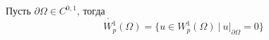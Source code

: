 \documentclass[12pt,a4paper]{article}
\begin{document}
\begin{theorem}{}{}
	Пусть $\partial \Omega \in C^{0, 1}$, тогда
	\begin{equation*}
		\mathring{W_p^1} (\Omega) = \{ u \in W_p^1 (\Omega) \ | \ u|_{\partial \Omega} = 0\}
	\end{equation*}
\end{theorem}

\newpage

\end{document}
